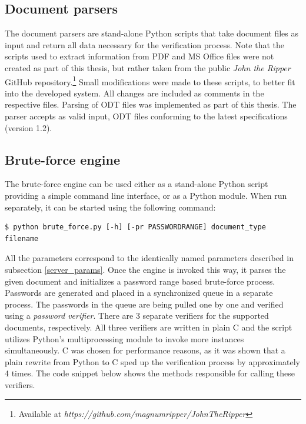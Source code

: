 \documentclass[11pt,oneside]{fithesis2}
\begin{document}
\subsection{Document parsers} \label{doc_parsers}

The document parsers are stand-alone Python scripts that take document files as input and return all  data necessary for the verification process. Note that the scripts used to extract information from PDF and MS Office files were not created as part of this thesis, but rather taken from the public \textit{John the Ripper} GitHub repository.\footnote{Available at \textit{https://github.com/magnumripper/JohnTheRipper}} Small modifications were made to these scripts, to better fit into the developed system. All changes are included as comments in the respective files. Parsing of ODT files was implemented as part of this thesis. The parser accepts as valid input, ODT files conforming to the latest specifications (version 1.2).

\subsection{Brute-force engine}\label{brute_force_engine}

The brute-force engine can be used either as a stand-alone Python script providing a simple command line interface, or as a Python module. When run separately, it can be started using the following command:

\begin{lstlisting}
$ python brute_force.py [-h] [-pr PASSWORDRANGE] document_type filename
\end{lstlisting}

All the parameters correspond to the identically named parameters described in subsection \ref{server_params}. Once the engine is invoked this way, it parses the given document and initializes a password range based brute-force process. Passwords are generated and placed in a synchronized queue in a separate process. The passwords in the queue are being pulled one by one and verified using a \textit{password verifier}. There are 3 separate verifiers for the supported documents, respectively. All three verifiers are written in plain C and the script utilizes Python's multiprocessing module to invoke more instances simultaneously. C was chosen for performance reasons, as it was shown that a plain rewrite from Python to C sped up the verification process by approximately 4 times. The code snippet below shows the methods responsible for calling these verifiers.
\end{document}
